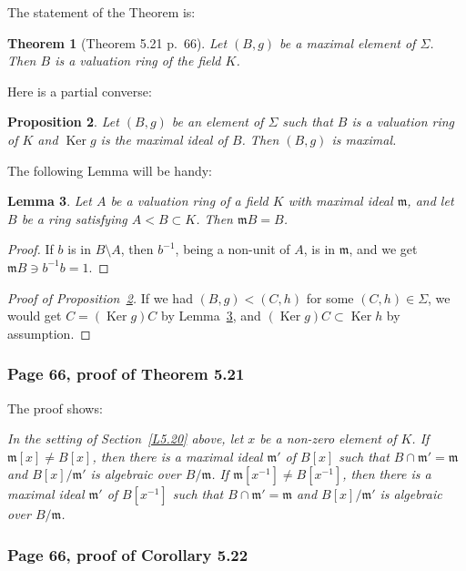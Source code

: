 \documentclass[12pt,letterpaper]{article}%
\newcommand{\mf}{\mathfrak}
\newcommand{\mmm}{\mf m}
\newcommand{\Ker}{\operatorname{Ker}}\newcommand{\Coker}{\operatorname{Coker}}
\newcommand{\nn}{\noindent}
\newtheorem{thm}{Theorem}%
\newtheorem{lem}[thm]{Lemma}
\newtheorem{prop}[thm]{Proposition}
\begin{document}
The statement of the Theorem is:

\begin{thm}[Theorem 5.21 p.~66]
Let $(B,g)$ be a maximal element of $\Sigma$. Then $B$ is a valuation ring of the field $K$.
\end{thm}

Here is a partial converse:

\begin{prop}\label{521}
Let $(B,g)$ be an element of $\Sigma$ such that $B$ is a valuation ring of $K$ and $\Ker g$ is the maximal ideal of $B$. Then $(B,g)$ is maximal.
\end{prop}

The following Lemma will be handy:

\begin{lem}\label{vrok}
Let $A$ be a valuation ring of a field $K$ with maximal ideal $\mmm$, and let $B$ be a ring satisfying $A<B\subset K$. Then $\mmm B=B$.
\end{lem}

\begin{proof}
If $b$ is in $B\setminus A$, then $b^{-1}$, being a non-unit of $A$, is in $\mmm$, and we get $\mmm B\ni b^{-1}b=1$.
\end{proof}

\begin{proof}[Proof of Proposition~\ref{521}] 
If we had $(B,g)<(C,h)$ for some $(C,h)\in\Sigma$, we would get $C=(\Ker g)C$ by Lemma~\ref{vrok}, and $(\Ker g)C\subset\Ker h$ by assumption. 
\end{proof}

\subsubsection{Page 66, proof of Theorem 5.21}\label{521p}%

The proof shows:

\nn\emph{In the setting of Section~\ref{L5.20} above, let $x$ be a non-zero element of $K$. If $\mmm[x]\ne B[x]$, then there is a maximal ideal $\mmm'$ of $B[x]$ such that $B\cap\mmm'=\mmm$ and $B[x]/\mmm'$ is algebraic over $B/\mmm$. If $\mmm[x^{-1}]\ne B[x^{-1}]$, then there is a maximal ideal $\mmm'$ of $B[x^{-1}]$ such that $B\cap\mmm'=\mmm$ and $B[x]/\mmm'$ is algebraic over $B/\mmm$.}

\subsubsection{Page 66, proof of Corollary 5.22}%
\end{document}
